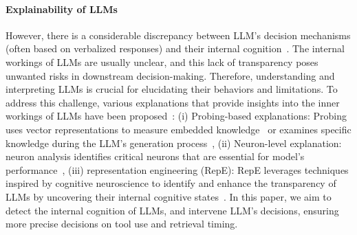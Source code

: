 \paragraph{Explainability of LLMs}
However, there is a considerable discrepancy between LLM's decision mechanisms (often based on verbalized responses) and their internal cognition~\citep{zou2023representation}. The internal workings of LLMs are usually unclear, and this lack of transparency poses unwanted risks in downstream decision-making. Therefore, understanding and interpreting LLMs is crucial for elucidating their behaviors and limitations. To address this challenge, various explanations that provide insights into the inner workings of LLMs have been proposed~\citep{zhao2024explainability}: 
(i) Probing-based explanations: Probing uses vector representations to measure embedded knowledge~\citep{peters2018dissecting, jawahar} or examines specific knowledge during the LLM's generation process~\citep{li2022probing}, (ii) Neuron-level explanation: neuron analysis identifies critical neurons that are essential for model's performance~\citep{antverg2021pitfalls,bills2023language}, (iii) representation engineering (RepE): RepE leverages techniques inspired by cognitive neuroscience to identify and enhance the transparency of LLMs by uncovering their internal cognitive states~\citep{zou2023representation}. In this paper, we aim to detect the internal cognition of LLMs, and intervene LLM's decisions, \ie ensuring more precise decisions on tool use and retrieval timing.